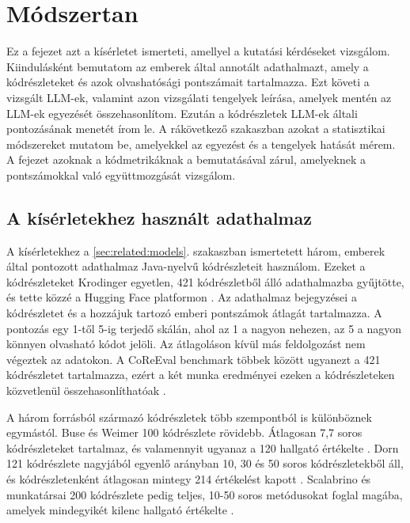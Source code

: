 \documentclass[
]{elteikthesis}[2024/04/26]
\begin{document}
\cleardoublepage











\chapter{Módszertan}
\label{ch:method}

Ez a fejezet azt a kísérletet ismerteti, amellyel a kutatási kérdéseket
vizsgálom. Kiindulásként bemutatom az emberek által annotált adathalmazt, amely
a kódrészleteket és azok olvashatósági pontszámait tartalmazza. Ezt követi a
vizsgált LLM-ek, valamint azon vizsgálati tengelyek leírása, amelyek mentén az
LLM-ek egyezését %
összehasonlítom. Ezután a kódrészletek LLM-ek általi pontozásának menetét írom
le. A rákövetkező szakaszban azokat a statisztikai módszereket mutatom be,
amelyekkel az egyezést és a tengelyek hatását mérem. A fejezet azoknak a
kódmetrikáknak a bemutatásával zárul, amelyeknek a pontszámokkal való
együttmozgását vizsgálom.

\section{A kísérletekhez használt adathalmaz}
\label{sec:method:dataset}

A kísérletekhez a \ref{sec:related:models}. szakaszban ismertetett három,
emberek által pontozott adathalmaz Java-nyelvű kódrészleteit használom. Ezeket a
kódrészleteket Krodinger egyetlen, 421 kódrészletből álló adathalmazba
gyűjtötte, és tette közzé a Hugging Face platformon \cite{krodinger2023merged}.
Az adathalmaz bejegyzései a kódrészletet és a hozzájuk tartozó emberi pontszámok átlagát tartalmazza.
A pontozás egy 1-től 5-ig terjedő skálán, ahol az 1 a nagyon nehezen, az 5 a nagyon könnyen
olvasható kódot jelöli. Az átlagoláson kívül más feldolgozást nem végeztek az
adatokon. A CoReEval benchmark többek között ugyanezt a 421 kódrészletet
tartalmazza, ezért a két munka eredményei ezeken a kódrészleteken közvetlenül %
összehasonlíthatóak \cite{ouedraogo2025coreeval}.

A három forrásból származó kódrészletek több szempontból is különböznek
egymástól. Buse és Weimer 100 kódrészlete rövidebb. Átlagosan 7,7 soros
kódrészleteket tartalmaz, és valamennyit ugyanaz a 120 hallgató értékelte
\cite{buse2008metric}. Dorn 121 kódrészlete nagyjából egyenlő arányban 10, 30 és
50 soros kódrészletekből áll, és kódrészletenként átlagosan mintegy 214
értékelést kapott \cite{dorn2012general}. Scalabrino és munkatársai 200
kódrészlete pedig teljes, 10-50 soros metódusokat foglal magába, amelyek
mindegyikét kilenc hallgató értékelte \cite{scalabrino2016improving}.
\end{document}

